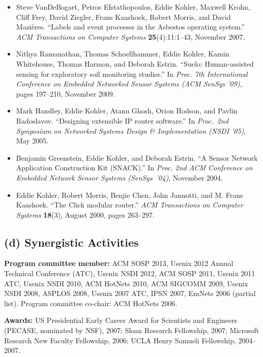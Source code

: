 \documentclass[11pt]{article}
\begin{document}
\begin{itemize}
\itemsep=0pt
\parsep=0pt
\leftmargin=0pt

\item Steve VanDeBogart, Petros Efstathopoulos, Eddie Kohler, Maxwell
  Krohn, Cliff Frey, David Ziegler, Frans Kaashoek, Robert Morris, and
  David Mazi\`eres. ``Labels and event processes in the Asbestos operating
  system.'' \emph{ACM Transactions on Computer Systems}
  \textbf{25}(4):11:1--43, November 2007.

\item Nithya Ramanathan, Thomas Schoellhammer, Eddie Kohler, Kamin
  Whitehouse, Thomas Harmon, and Deborah Estrin. ``Suelo: Human-assisted
  sensing for exploratory soil monitoring studies.'' In \emph{Proc. 7th
  International Conference on Embedded Networked Sensor Systems (ACM SenSys
  '09)}, pages 197--210, November 2009.

\item Mark Handley, Eddie Kohler, Atanu Ghosh, Orion Hodson, and Pavlin
  Radoslavov. ``Designing extensible IP router software.'' In
  \emph{Proc.\ 2nd Symposium on Networked Systems Design \& Implementation
  (NSDI '05)}, May 2005.

\item Benjamin Greenstein, Eddie Kohler, and Deborah Estrin.  ``A Sensor
  Network Application Construction Kit (SNACK).''  In \emph{Proc. 2nd ACM
  Conference on Embedded Network Sensor Systems (SenSys~'04)}, November
  2004.

\item Eddie Kohler, Robert Morris, Benjie Chen, John Jannotti, and M. Frans
  Kaashoek. ``The Click modular router.'' \emph{ACM Transactions on
  Computer Systems} \textbf{18}(3), August 2000, pages 263--297.

\end{itemize}


\subsection*{(d) Synergistic Activities}
%
\textbf{Program committee member:} ACM SOSP 2013, Usenix 2012 Annual
Technical Conference (ATC), Usenix NSDI 2012, ACM SOSP 2011, Usenix 2011
ATC, Usenix NSDI 2010, ACM HotNets 2010, ACM SIGCOMM 2009, Usenix NSDI
2008, ASPLOS 2008, Usenix 2007 ATC, IPSN 2007, EmNets 2006 (partial
list). Program committee co-chair: ACM HotNets 2006.

\textbf{Awards:} US Presidential Early Career Award for Scientists and
Engineers (PECASE, nominated by NSF), 2007; Sloan Research Fellowship,
2007; Microsoft Research New Faculty Fellowship, 2006; UCLA Henry Samueli
Fellowship, 2004--2007.
\end{document}
